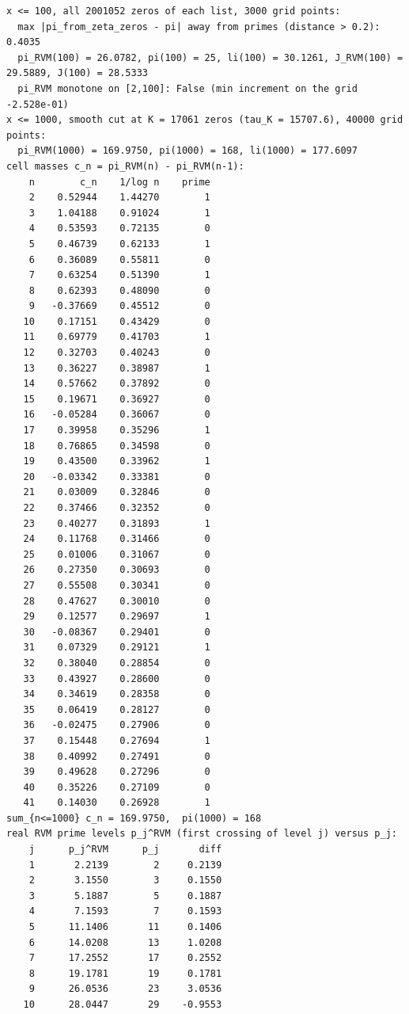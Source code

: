 \documentclass[11pt,reqno]{amsart}
\numberwithin{equation}{section}
\theoremstyle{plain}
\theoremstyle{definition}
\theoremstyle{remark}
\begin{document}
\begin{lstlisting}[style=out]
x <= 100, all 2001052 zeros of each list, 3000 grid points:
  max |pi_from_zeta_zeros - pi| away from primes (distance > 0.2): 0.4035
  pi_RVM(100) = 26.0782, pi(100) = 25, li(100) = 30.1261, J_RVM(100) = 29.5889, J(100) = 28.5333
  pi_RVM monotone on [2,100]: False (min increment on the grid -2.528e-01)
x <= 1000, smooth cut at K = 17061 zeros (tau_K = 15707.6), 40000 grid points:
  pi_RVM(1000) = 169.9750, pi(1000) = 168, li(1000) = 177.6097
cell masses c_n = pi_RVM(n) - pi_RVM(n-1):
    n        c_n    1/log n    prime
    2    0.52944    1.44270        1
    3    1.04188    0.91024        1
    4    0.53593    0.72135        0
    5    0.46739    0.62133        1
    6    0.36089    0.55811        0
    7    0.63254    0.51390        1
    8    0.62393    0.48090        0
    9   -0.37669    0.45512        0
   10    0.17151    0.43429        0
   11    0.69779    0.41703        1
   12    0.32703    0.40243        0
   13    0.36227    0.38987        1
   14    0.57662    0.37892        0
   15    0.19671    0.36927        0
   16   -0.05284    0.36067        0
   17    0.39958    0.35296        1
   18    0.76865    0.34598        0
   19    0.43500    0.33962        1
   20   -0.03342    0.33381        0
   21    0.03009    0.32846        0
   22    0.37466    0.32352        0
   23    0.40277    0.31893        1
   24    0.11768    0.31466        0
   25    0.01006    0.31067        0
   26    0.27350    0.30693        0
   27    0.55508    0.30341        0
   28    0.47627    0.30010        0
   29    0.12577    0.29697        1
   30   -0.08367    0.29401        0
   31    0.07329    0.29121        1
   32    0.38040    0.28854        0
   33    0.43927    0.28600        0
   34    0.34619    0.28358        0
   35    0.06419    0.28127        0
   36   -0.02475    0.27906        0
   37    0.15448    0.27694        1
   38    0.40992    0.27491        0
   39    0.49628    0.27296        0
   40    0.35226    0.27109        0
   41    0.14030    0.26928        1
sum_{n<=1000} c_n = 169.9750,  pi(1000) = 168
real RVM prime levels p_j^RVM (first crossing of level j) versus p_j:
    j      p_j^RVM      p_j       diff
    1       2.2139        2     0.2139
    2       3.1550        3     0.1550
    3       5.1887        5     0.1887
    4       7.1593        7     0.1593
    5      11.1406       11     0.1406
    6      14.0208       13     1.0208
    7      17.2552       17     0.2552
    8      19.1781       19     0.1781
    9      26.0536       23     3.0536
   10      28.0447       29    -0.9553

\end{lstlisting}
\end{document}
